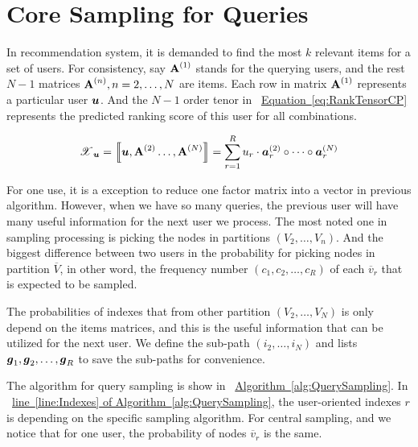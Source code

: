 \documentclass[letterpaper]{article}
\newcommand{\T}[1]{\boldsymbol{\mathscr{\MakeUppercase{#1}}}}
\newcommand{\KT}[1]{\left\llbracket #1 \right\rrbracket}
\newcommand{\V}[1]{{\bm{{\MakeLowercase{#1}}}}}
\newcommand{\VnC}[3]{\V{#1}^{(#2)}_{#3}}
\newcommand{\M}[1]{{\bm{\mathbf{\MakeUppercase{#1}}}}}
\newcommand{\Mn}[2]{\M{#1}^{(#2)}}
\newcommand{\Eqn}[1] {\hyperref[eq:#1]  {Equation~\ref*{eq:#1}}}
\newcommand{\Alg}[1] {\hyperref[alg:#1] {Algorithm~\ref*{alg:#1}}}
\newcommand{\AlgLine}[2]{\hyperref[alg:#1]{line~\ref*{line:#2} of Algorithm~\ref*{alg:#1}}}
\begin{document}
\section{Core Sampling for Queries}
In recommendation system, it is demanded to find the most $k$ relevant items for a set of users. For consistency, say $\M{A}^{(1)}$ stands for the querying users, and the rest $N-1$ matrices $\M{A}^{(n)},n=2,\ldots,N$ are items. Each row in matrix $\M{A}^{(1)}$ represents a particular user $\V{u}$. And the $N-1$ order tenor in ~\Eqn{RankTensorCP} represents the predicted ranking score of this user for all combinations.

\begin{equation}\label{eq:RankTensorCP}
\T{X}_{\V{u}}= \KT{ \V{u},\Mn{A}{2}\dots,\Mn{A}{N}} =
\sum_{r=1}^{R} u_r \cdot \VnC{A}{2}{r}\circ \cdots \circ \VnC{A}{N}{r}
\end{equation}

For one use, it is a exception to reduce one factor matrix into a vector in previous algorithm. However, when we have so many queries, the previous user will have many useful information for the next user we process. The most noted one in sampling processing is picking the nodes in partitions $(V_2,\ldots,V_n)$. And the biggest difference between two users in the probability for picking nodes in partition $\overline{V}$, in other word, the frequency number $(c_1,c_2,\ldots,c_R)$ of each $\overline{v}_r$ that is expected to be sampled.

The probabilities of indexes that from other partition $(V_2,\ldots,V_N)$ is only depend on the items matrices, and this is the useful information that can be utilized for the next user. We define the sub-path $(i_2,\ldots,i_N)$ and lists $\V{g}_1,\V{g}_2,\ldots,\V{g}_R$ to save the sub-paths for convenience.

The algorithm for query sampling is show in ~\Alg{QuerySampling}.
In ~\AlgLine{QuerySampling}{Indexes}, the user-oriented indexes $r$ is depending on the
specific sampling algorithm. For central sampling, and we notice that for one user, the probability of nodes $\overline{v}_r$ is the same.
\end{document}
